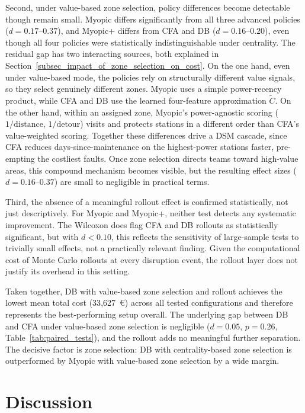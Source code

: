 \documentclass[12pt,oneside]{article}
\begin{document}
Second, under value-based zone selection, policy differences become detectable though remain small. Myopic differs significantly from all three advanced policies ($d = 0.17$--$0.37$), and Myopic+ differs from CFA and DB ($d = 0.16$--$0.20$), even though all four policies were statistically indistinguishable under centrality. The residual gap has two interacting sources, both explained in Section~\ref{subsec_impact_of_zone_selection_on_cost}. On the one hand, even under value-based mode, the policies rely on structurally different value signals, so they select genuinely different zones. Myopic uses a simple power-recency product, while CFA and DB use the learned four-feature approximation $\tilde{C}$. On the other hand, within an assigned zone, Myopic's power-agnostic scoring ($1/\text{distance}$, $1/\text{detour}$) visits and protects stations in a different order than CFA's value-weighted scoring. Together these differences drive a DSM cascade, since CFA reduces days-since-maintenance on the highest-power stations faster, pre-empting the costliest faults. Once zone selection directs teams toward high-value areas, this compound mechanism becomes visible, but the resulting effect sizes ($d = 0.16$--$0.37$) are small to negligible in practical terms.

Third, the absence of a meaningful rollout effect is confirmed statistically, not just descriptively. For Myopic and Myopic+, neither test detects any systematic improvement. The Wilcoxon does flag CFA and DB rollouts as statistically significant, but with $d < 0.10$, this reflects the sensitivity of large-sample tests to trivially small effects, not a practically relevant finding. Given the computational cost of Monte Carlo rollouts at every disruption event, the rollout layer does not justify its overhead in this setting.

Taken together, DB with value-based zone selection and rollout achieves the lowest mean total cost (33{,}627~€) across all tested configurations and therefore represents the best-performing setup overall. The underlying gap between DB and CFA under value-based zone selection is negligible ($d = 0.05$, $p = 0.26$, Table~\ref{tab:paired_tests}), and the rollout adds no meaningful further separation. The decisive factor is zone selection: DB with centrality-based zone selection is outperformed by Myopic with value-based zone selection by a wide margin.


\section{Discussion}\label{sec:discussion}
\end{document}
